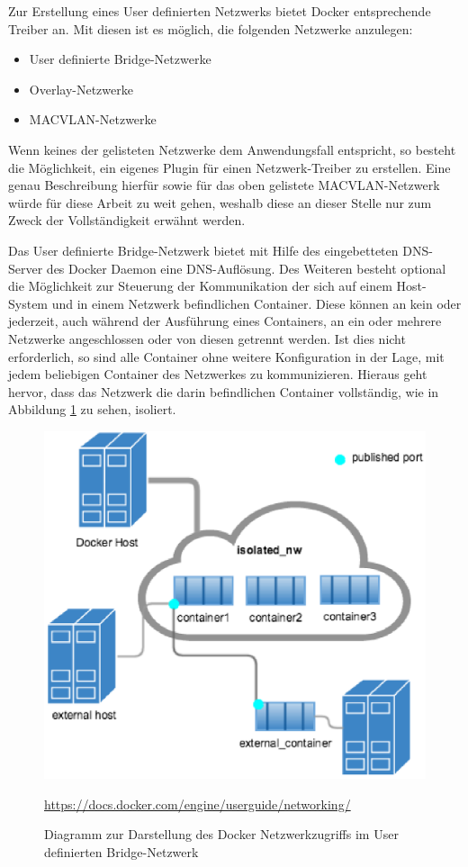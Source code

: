 Zur Erstellung eines User definierten Netzwerks bietet Docker entsprechende Treiber an.
Mit diesen ist es möglich, die folgenden Netzwerke anzulegen:

\begin{itemize}
	\item User definierte Bridge-Netzwerke
	\item Overlay-Netzwerke
	\item MACVLAN-Netzwerke
\end{itemize}

Wenn keines der gelisteten Netzwerke dem Anwendungsfall entspricht, so besteht die Möglichkeit, ein eigenes Plugin für einen Netzwerk-Treiber zu erstellen.
Eine genau Beschreibung hierfür sowie für das oben gelistete MACVLAN-Netzwerk würde für diese Arbeit zu weit gehen, weshalb diese an dieser Stelle nur zum Zweck der Vollständigkeit erwähnt werden.

Das User definierte Bridge-Netzwerk bietet mit Hilfe des eingebetteten DNS-Server des Docker Daemon eine DNS-Auflösung.
Des Weiteren besteht optional die Möglichkeit zur Steuerung der Kommunikation der sich auf einem Host-System und in einem Netzwerk befindlichen Container.
Diese können an kein oder jederzeit, auch während der Ausführung eines Containers, an ein oder mehrere Netzwerke angeschlossen oder von diesen getrennt werden.
Ist dies nicht erforderlich, so sind alle Container ohne weitere Konfiguration in der Lage, mit jedem beliebigen Container des Netzwerkes zu kommunizieren.
Hieraus geht hervor, dass das Netzwerk die darin befindlichen Container vollständig, wie in Abbildung \ref{fig:dockerportpuex} zu sehen, isoliert.

\begin{figure}[H]
	\centering
	\includegraphics[width=0.7\linewidth]{figures/DockerPortPuEx}
	\caption[Docker Netzwerkzugriff]{Diagramm zur Darstellung des Docker Netzwerkzugriffs im User definierten Bridge-Netzwerk}
	\label{fig:dockerportpuex}
	\tiny{\quelle\url{https://docs.docker.com/engine/userguide/networking/}}
\end{figure}

